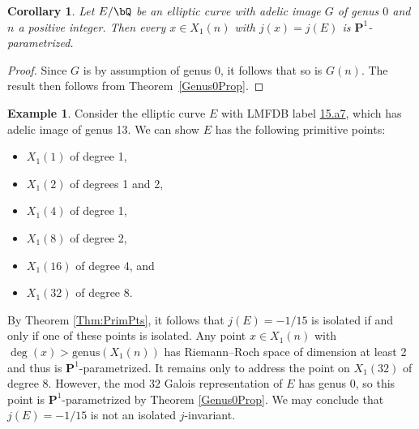 \documentclass[11pt,reqno]{amsart}
\theoremstyle{plain}
\newtheorem{corollary}[theorem]{Corollary}
\theoremstyle{definition}
\newtheorem{example}[theorem]{Example}
\newcommand{\Q}{\bQ}
\newcommand{\PP}{\mathbf P}
\begin{document}
\begin{corollary}\label{cor:adelicgaloisgenus0}
Let $E/\Q$ be an elliptic curve with adelic image $G$ of genus $0$ and $n$ a positive integer. %
Then 
every $x \in X_1(n)$ with $j(x) = j(E)$ is $\PP^1$-parametrized.
\end{corollary}
\begin{proof}
Since $G$ is by assumption of genus $0$, it follows that so is $G(n)$. The result then follows from Theorem~\ref{Genus0Prop}.
\end{proof}




\begin{example}\label{eg:modngenus0}
  Consider the elliptic curve $E$ with LMFDB label \href{https://www.lmfdb.org/EllipticCurve/Q/15/a/7}{15.a7}, which has adelic image of genus 13. We can show $E$ has the following primitive points:
\begin{itemize}
    \item $X_1(1)$ of degree 1,
    \item $X_1(2)$ of degrees 1 and 2,
    \item $X_1(4)$ of degree 1,
    \item $X_1(8)$ of degree 2,
    \item $X_1(16)$ of degree 4, and
    \item $X_1(32)$ of degree 8.
\end{itemize}
By Theorem \ref{Thm:PrimPts}, it follows that $j(E)=-1/15$ is isolated if and only if one of these points is isolated. Any point $x \in X_1(n)$ with $\deg(x)>\text{genus}(X_1(n))$ has Riemann--Roch space of dimension at least 2 and thus is $\PP^1$-parametrized. It remains only to address the point on $X_1(32)$ of degree 8. However, the mod $32$ Galois representation of $E$ has genus $0$, so this point is $\PP^1$-parametrized by Theorem \ref{Genus0Prop}. We may conclude that $j(E)=-1/15$ is not an isolated $j$-invariant.
\end{example}
\end{document}

